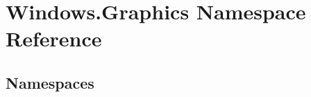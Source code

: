\hypertarget{namespace_windows_1_1_graphics}{}\section{Windows.\+Graphics Namespace Reference}
\label{namespace_windows_1_1_graphics}
\subsection*{Namespaces}
\begin{DoxyCompactItemize}
\end{DoxyCompactItemize}
